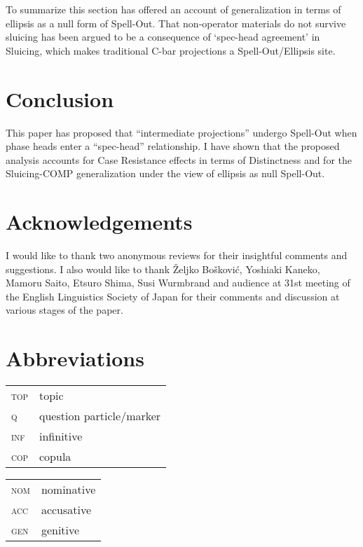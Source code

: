 \documentclass[output=paper]{langscibook}
\begin{document}
To summarize this section has offered an account of  generalization in terms of ellipsis as a null form of Spell-Out. That non-operator materials do not survive sluicing has been argued to be a consequence of `spec-head agreement' in Sluicing, which makes traditional C-bar projections a Spell-Out/Ellipsis site.

\section{Conclusion}\label{aranosect5}
This paper has proposed that  ``intermediate projections'' undergo Spell-Out when phase heads enter a ``spec-head'' relationship. I have shown that the proposed analysis accounts for Case Resistance effects in terms of Distinctness and for the Sluicing-COMP generalization under the view of ellipsis as null Spell-Out.



\section*{Acknowledgements}
I would like to thank two anonymous reviews for their insightful comments and suggestions. I also would like to thank Željko Bošković, Yoshiaki Kaneko, Mamoru Saito, Etsuro Shima, Susi Wurmbrand and audience at 31st meeting of the English Linguistics Society of Japan for their comments and discussion at various stages of the paper. 

\section*{Abbreviations}
\begin{tabularx}{.45\textwidth}{lQ}
\textsc{top} & topic\\
\textsc{q} & question particle/marker\\
\textsc{inf} & infinitive\\
\textsc{cop} & copula \\
\end{tabularx}
\begin{tabularx}{.45\textwidth}{lQ}
\textsc{nom} & nominative\\
\textsc{acc} & accusative\\
\textsc{gen} & genitive \\
\end{tabularx}

\printbibliography[heading=subbibliography,notkeyword=this]
\end{document}
